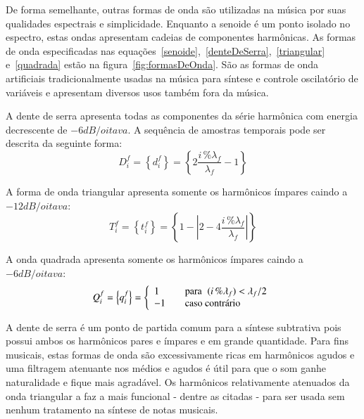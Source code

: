 De forma semelhante, outras formas de onda são utilizadas na música por suas qualidades
espectrais e simplicidade. Enquanto a senoide é um ponto isolado no espectro, estas 
ondas apresentam cadeias de componentes harmônicas.
As formas de onda especificadas nas equações~\ref{senoide},~\ref{denteDeSerra},~\ref{triangular} e~\ref{quadrada} estão na figura~\ref{fig:formasDeOnda}.
São as formas de onda artificiais tradicionalmente usadas na música para síntese e controle oscilatório de variáveis e apresentam diversos usos também fora da música.\cite{Openheim}

A dente de serra apresenta todas as componentes da série
harmônica com energia decrescente de $-6dB/oitava$. A sequência de amostras temporais pode ser descrita da seguinte forma:
\begin{equation}\label{denteDeSerra}
     D^f_i=\left\{ d^f_i \right\}=\left\{ 2\frac{i\,\%\lambda_f}{\lambda_f} -1 \right\}
\end{equation}

A forma de onda triangular apresenta somente os harmônicos ímpares caindo a $-12dB/oitava$:
\begin{equation}\label{triangular}
     T^f_i=\left\{ t^f_i \right\}=\left\{1- \left| 2 - 4\frac{i\,\%\lambda_f}{\lambda_f} \right| \right\}
\end{equation}

A onda quadrada apresenta somente os harmônicos ímpares caindo a $-6dB/oitava$:
\begin{equation}\label{quadrada}
     Q^f_i=\left\{ q^f_i \right\}= \left\{
         \begin{array}{l l}
              1 & \quad \text{para} \; \; (i\,\%\lambda_f)   <  \lambda_f /2  \\
              -1 & \quad \text{caso contrário}\\
         \end{array} \right.
\end{equation}

A dente de serra é um ponto de partida comum para a síntese subtrativa pois possui
ambos os harmônicos pares e ímpares e em grande quantidade. Para fins musicais, estas formas de onda são excessivamente ricas em harmônicos agudos e uma filtragem atenuante nos médios e agudos é útil para que o som ganhe naturalidade e fique mais agradável.
Os harmônicos relativamente atenuados da onda triangular
a faz a mais funcional - dentre as citadas - para ser usada sem nenhum tratamento na síntese de notas musicais.

